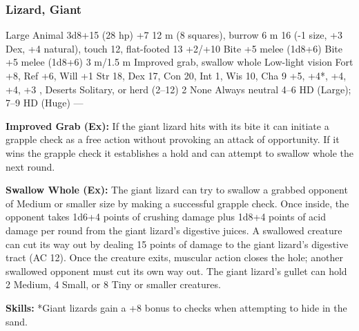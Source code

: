 \subsubsection{Lizard, Giant}
\begin{MonsterStats}
{Large Animal}
{3d8+15 (28 hp)}
{+7}
{12 m (8 squares), burrow 6 m}
{16 (-1 size, +3 Dex, +4 natural), touch 12, flat-footed 13}
{+2/+10}
{Bite +5 melee (1d8+6)}
{Bite +5 melee (1d8+6)}
{3 m/1.5 m}
{Improved grab, swallow whole}
{Low-light vision}
{Fort +8, Ref +6, Will +1}
{Str 18, Dex 17, Con 20, Int 1, Wis 10, Cha 9}
{ +5,  +4*,  +4,  +4,  +3}
{, }
{Deserts}
{Solitary, or herd (2--12)}
{2}
{None}
{Always neutral}
{4--6 HD (Large); 7--9 HD (Huge)}
{---}
\end{MonsterStats}

\textbf{Improved Grab (Ex):} If the giant lizard hits with its bite it can initiate a grapple check as a free action without provoking an attack of opportunity. If it wins the grapple check it establishes a hold and can attempt to swallow whole the next round.

\textbf{Swallow Whole (Ex):} The giant lizard can try to swallow a grabbed opponent of Medium or smaller size by making a successful grapple check. Once inside, the opponent takes 1d6+4 points of crushing damage plus 1d8+4 points of acid damage per round from the giant lizard's digestive juices. A swallowed creature can cut its way out by dealing 15 points of damage to the giant lizard's digestive tract (AC 12). Once the creature exits, muscular action closes the hole; another swallowed opponent must cut its own way out. The giant lizard's gullet can hold 2 Medium, 4 Small, or 8 Tiny or smaller creatures.

\textbf{Skills:} *Giant lizards gain a +8 bonus to  checks when attempting to hide in the sand.
